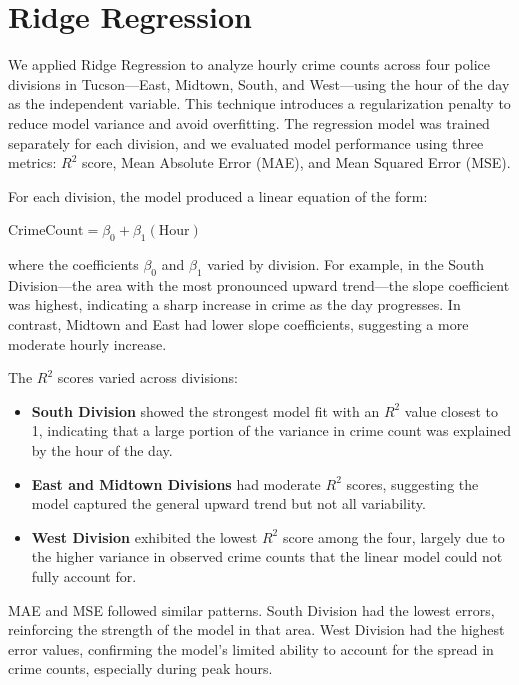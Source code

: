 \documentclass{report}
\begin{document}
\newpage
\section{Ridge Regression}
\par We applied Ridge Regression to analyze hourly crime counts across four police divisions in Tucson—East, Midtown, South, and West—using the hour of the day as the independent variable. This technique introduces a regularization penalty to reduce model variance and avoid overfitting. The regression model was trained separately for each division, and we evaluated model performance using three metrics: $R^2$ score, Mean Absolute Error (MAE), and Mean Squared Error (MSE).

For each division, the model produced a linear equation of the form:

\begin{center}
  \begin{math}
    \text{CrimeCount} = \beta_0 + \beta_1(\text{Hour})
  \end{math}
\end{center}

where the coefficients $\beta_0$ and $\beta_1$ varied by division. For example, in the South Division—the area with the most pronounced upward trend—the slope coefficient was highest, indicating a sharp increase in crime as the day progresses. In contrast, Midtown and East had lower slope coefficients, suggesting a more moderate hourly increase.

The $R^2$ scores varied across divisions:
\begin{itemize}
\item \textbf{South Division} showed the strongest model fit with an $R^2$ value closest to 1, indicating that a large portion of the variance in crime count was explained by the hour of the day.
\item \textbf{East and Midtown Divisions} had moderate $R^2$ scores, suggesting the model captured the general upward trend but not all variability.
\item \textbf{West Division} exhibited the lowest $R^2$ score among the four, largely due to the higher variance in observed crime counts that the linear model could not fully account for.
\end{itemize}

MAE and MSE followed similar patterns. South Division had the lowest errors, reinforcing the strength of the model in that area. West Division had the highest error values, confirming the model's limited ability to account for the spread in crime counts, especially during peak hours.
\end{document}
